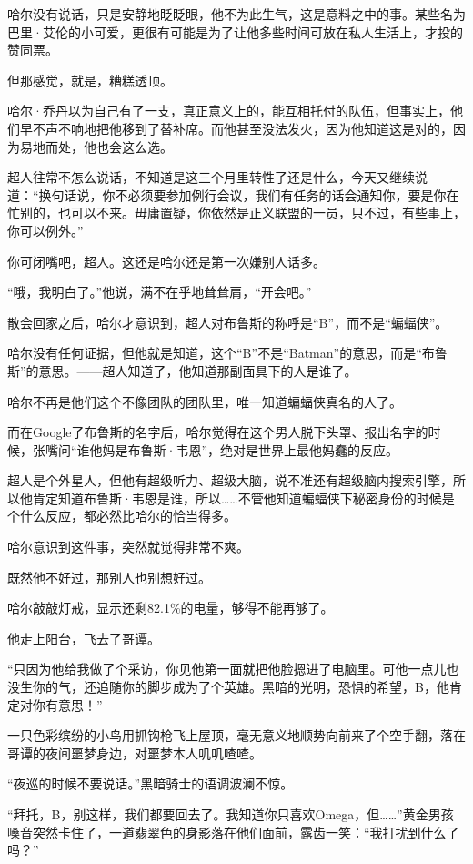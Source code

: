 \documentclass[../main]{subfiles}
\begin{document}
哈尔没有说话，只是安静地眨眨眼，他不为此生气，这是意料之中的事。某些名为巴里·艾伦的小可爱，更很有可能是为了让他多些时间可放在私人生活上，才投的赞同票。

但那感觉，就是，糟糕透顶。

哈尔·乔丹以为自己有了一支，真正意义上的，能互相托付的队伍，但事实上，他们早不声不响地把他移到了替补席。而他甚至没法发火，因为他知道这是对的，因为易地而处，他也会这么选。

超人往常不怎么说话，不知道是这三个月里转性了还是什么，今天又继续说道：“换句话说，你不必须要参加例行会议，我们有任务的话会通知你，要是你在忙别的，也可以不来。毋庸置疑，你依然是正义联盟的一员，只不过，有些事上，你可以例外。”

你可闭嘴吧，超人。这还是哈尔还是第一次嫌别人话多。

“哦，我明白了。”他说，满不在乎地耸耸肩，“开会吧。”

散会回家之后，哈尔才意识到，超人对布鲁斯的称呼是“B”，而不是“蝙蝠侠”。

哈尔没有任何证据，但他就是知道，这个“B”不是“Batman”的意思，而是“布鲁斯”的意思。——超人知道了，他知道那副面具下的人是谁了。

哈尔不再是他们这个不像团队的团队里，唯一知道蝙蝠侠真名的人了。

而在Google了布鲁斯的名字后，哈尔觉得在这个男人脱下头罩、报出名字的时候，张嘴问“谁他妈是布鲁斯·韦恩”，绝对是世界上最他妈蠢的反应。

超人是个外星人，但他有超级听力、超级大脑，说不准还有超级脑内搜索引擎，所以他肯定知道布鲁斯·韦恩是谁，所以……不管他知道蝙蝠侠下秘密身份的时候是个什么反应，都必然比哈尔的恰当得多。

哈尔意识到这件事，突然就觉得非常不爽。

既然他不好过，那别人也别想好过。

哈尔敲敲灯戒，显示还剩82.1\%的电量，够得不能再够了。

他走上阳台，飞去了哥谭。

“只因为他给我做了个采访，你见他第一面就把他脸摁进了电脑里。可他一点儿也没生你的气，还追随你的脚步成为了个英雄。黑暗的光明，恐惧的希望，B，他肯定对你有意思！”

一只色彩缤纷的小鸟用抓钩枪飞上屋顶，毫无意义地顺势向前来了个空手翻，落在哥谭的夜间噩梦身边，对噩梦本人叽叽喳喳。

“夜巡的时候不要说话。”黑暗骑士的语调波澜不惊。

“拜托，B，别这样，我们都要回去了。我知道你只喜欢Omega，但\ldots\ldots”黄金男孩嗓音突然卡住了，一道翡翠色的身影落在他们面前，露齿一笑：“我打扰到什么了吗？”
\end{document}

